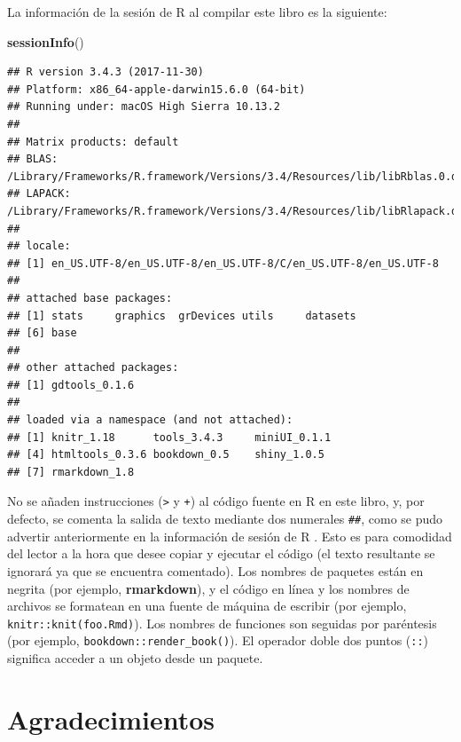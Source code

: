 \documentclass[12pt,]{krantz}
\makeatletter
\newenvironment{Shaded}{\begin{snugshade}}{\end{snugshade}}
\newcommand{\KeywordTok}[1]{\textcolor[rgb]{0.13,0.29,0.53}{\textbf{#1}}}
\newcommand{\NormalTok}[1]{#1}
\newenvironment{kframe}{%
\medskip{}
\setlength{\fboxsep}{.8em}
 \def\at@end@of@kframe{}%
 \ifinner\ifhmode%
  \def\at@end@of@kframe{\end{minipage}}%
  \begin{minipage}{\columnwidth}%
 \fi\fi%
 \def\FrameCommand##1{\hskip\@totalleftmargin \hskip-\fboxsep
 \colorbox{shadecolor}{##1}\hskip-\fboxsep
     \hskip-\linewidth \hskip-\@totalleftmargin \hskip\columnwidth}%
 \MakeFramed {\advance\hsize-\width
   \@totalleftmargin\z@ \linewidth\hsize
   \@setminipage}}%
 {\par\unskip\endMakeFramed%
 \at@end@of@kframe}
\renewenvironment{Shaded}{\begin{kframe}}{\end{kframe}}
\theoremstyle{definition}
\theoremstyle{definition}
\theoremstyle{definition}
\theoremstyle{remark}
\makeatother
\begin{document}
La información de la sesión de R al compilar este libro es la siguiente:

\begin{Shaded}
\begin{Highlighting}[]
\KeywordTok{sessionInfo}\NormalTok{()}
\end{Highlighting}
\end{Shaded}

\begin{verbatim}
## R version 3.4.3 (2017-11-30)
## Platform: x86_64-apple-darwin15.6.0 (64-bit)
## Running under: macOS High Sierra 10.13.2
## 
## Matrix products: default
## BLAS: /Library/Frameworks/R.framework/Versions/3.4/Resources/lib/libRblas.0.dylib
## LAPACK: /Library/Frameworks/R.framework/Versions/3.4/Resources/lib/libRlapack.dylib
## 
## locale:
## [1] en_US.UTF-8/en_US.UTF-8/en_US.UTF-8/C/en_US.UTF-8/en_US.UTF-8
## 
## attached base packages:
## [1] stats     graphics  grDevices utils     datasets 
## [6] base     
## 
## other attached packages:
## [1] gdtools_0.1.6
## 
## loaded via a namespace (and not attached):
## [1] knitr_1.18      tools_3.4.3     miniUI_0.1.1   
## [4] htmltools_0.3.6 bookdown_0.5    shiny_1.0.5    
## [7] rmarkdown_1.8
\end{verbatim}

No se añaden instrucciones (\texttt{\textgreater{}} y \texttt{+}) al
código fuente en R en este libro, y, por defecto, se comenta la salida
de texto mediante dos numerales \texttt{\#\#}, como se pudo advertir
anteriormente en la información de sesión de R . Esto es para comodidad
del lector a la hora que desee copiar y ejecutar el código (el texto
resultante se ignorará ya que se encuentra comentado). Los nombres de
paquetes están en negrita (por ejemplo, \textbf{rmarkdown}), y el código
en línea y los nombres de archivos se formatean en una fuente de máquina
de escribir (por ejemplo,
\texttt{knitr::knit(\textquotesingle{}foo.Rmd\textquotesingle{})}). Los
nombres de funciones son seguidas por paréntesis (por ejemplo,
\texttt{bookdown::render\_book()}). El operador doble dos puntos
(\texttt{::}) significa acceder a un objeto desde un paquete.

\section*{Agradecimientos}\label{agradecimientos}
\end{document}
